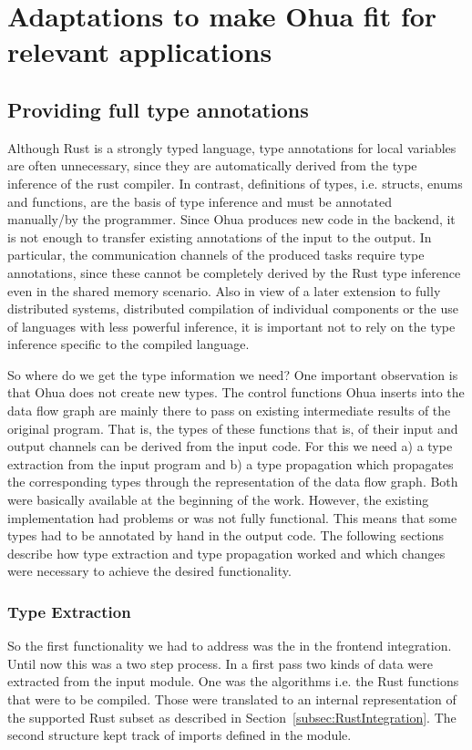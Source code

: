 \section{Adaptations to make Ohua fit for relevant applications}
\subsection{Providing full type annotations}
Although Rust is a strongly typed language, type annotations for local variables are often unnecessary, since they are automatically derived from the type inference of the rust compiler. In contrast, definitions of types, i.e. structs, enums and functions, are the basis of type inference and must be annotated manually/by the programmer. Since Ohua produces new code in the backend, it is not enough to transfer existing annotations of the input to the output. In particular, the communication channels of the produced tasks require type annotations, since these cannot be completely derived by the Rust type inference even in the shared memory scenario. Also in view of a later extension to fully distributed systems, distributed compilation of individual components or the use of languages with less powerful inference, it is important not to rely on the type inference specific to the compiled language. 

So where do we get the type information we need? One important observation is that Ohua does not create new types. The control functions Ohua inserts into the data flow graph are mainly there to pass on existing intermediate results of the original program. That is, the types of these functions that is, of their input and output channels can be derived from the input code. For this we need a) a type extraction from the input program and b) a type propagation which propagates the corresponding types through the representation of the data flow graph. Both were basically available at the beginning of the work. However, the existing implementation had problems or was not fully functional. This means that some types had to be annotated by hand in the output code. The following sections describe how type extraction and type propagation worked and which changes were necessary to achieve the desired functionality. \\

\subsubsection{Type Extraction}
So the first functionality we had to address was the  in the frontend integration. Until now this was a two step process. In a first pass two kinds of data were extracted from the input module. One was the algorithms i.e. the Rust functions that were to be compiled. Those were translated to an internal representation of the supported Rust subset as described in Section~\ref{subsec:RustIntegration}. The second structure kept track of imports defined in the module. \\

